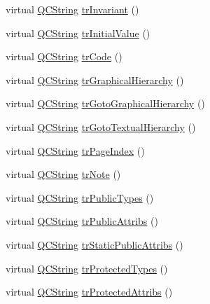\begin{DoxyCompactItemize}
\item 
virtual \hyperlink{class_q_c_string}{Q\+C\+String} \hyperlink{class_translator_chinesetraditional_a895236a1e7edd69286c8e068f4a3037c}{tr\+Invariant} ()
\item 
virtual \hyperlink{class_q_c_string}{Q\+C\+String} \hyperlink{class_translator_chinesetraditional_ad818eb8e6c599cea1267baf01a118ce9}{tr\+Initial\+Value} ()
\item 
virtual \hyperlink{class_q_c_string}{Q\+C\+String} \hyperlink{class_translator_chinesetraditional_a1e982f83fc7265c533b8d361b97c4a1a}{tr\+Code} ()
\item 
virtual \hyperlink{class_q_c_string}{Q\+C\+String} \hyperlink{class_translator_chinesetraditional_a785c89b9c9e46df0fb240582cce8b50e}{tr\+Graphical\+Hierarchy} ()
\item 
virtual \hyperlink{class_q_c_string}{Q\+C\+String} \hyperlink{class_translator_chinesetraditional_ab5092526b1326b9266d4c0d574bb1fed}{tr\+Goto\+Graphical\+Hierarchy} ()
\item 
virtual \hyperlink{class_q_c_string}{Q\+C\+String} \hyperlink{class_translator_chinesetraditional_a3cf669a7be42d22e620127f098443fa8}{tr\+Goto\+Textual\+Hierarchy} ()
\item 
virtual \hyperlink{class_q_c_string}{Q\+C\+String} \hyperlink{class_translator_chinesetraditional_a69b846809e1de89c78d5dca6d0ef753b}{tr\+Page\+Index} ()
\item 
virtual \hyperlink{class_q_c_string}{Q\+C\+String} \hyperlink{class_translator_chinesetraditional_a7e75e3258e819801427e68a79a65d5a7}{tr\+Note} ()
\item 
virtual \hyperlink{class_q_c_string}{Q\+C\+String} \hyperlink{class_translator_chinesetraditional_aed0544a831bf55daa893f036decc4ab8}{tr\+Public\+Types} ()
\item 
virtual \hyperlink{class_q_c_string}{Q\+C\+String} \hyperlink{class_translator_chinesetraditional_a506023119d6c8a31235d19dc0e17b033}{tr\+Public\+Attribs} ()
\item 
virtual \hyperlink{class_q_c_string}{Q\+C\+String} \hyperlink{class_translator_chinesetraditional_a5e646df025a62827cc725b996a877a9c}{tr\+Static\+Public\+Attribs} ()
\item 
virtual \hyperlink{class_q_c_string}{Q\+C\+String} \hyperlink{class_translator_chinesetraditional_ac8d3dc2342606b9caa8eb1ffb57817c2}{tr\+Protected\+Types} ()
\item 
virtual \hyperlink{class_q_c_string}{Q\+C\+String} \hyperlink{class_translator_chinesetraditional_ae81798951959c4cf3804c6d4738537a2}{tr\+Protected\+Attribs} ()

\end{DoxyCompactItemize}
